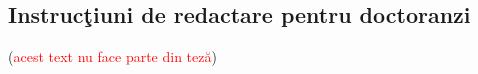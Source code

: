 
\ifpdf
    \graphicspath{{Instructions/Figs/Raster/}{Instructions/Figs/PDF/}{Instructions/Figs/}}
\else
    \graphicspath{{Instructions/Figs/Vector/}{Instructions/Figs/}}
\else
    \graphicspath{{Instructions/Figs/Regular/}{Instructions/Regular/}}    
\fi

\thispagestyle{empty}
 \newpage
 \newpage
\begin{center}
\section*{Instruc\c{t}iuni de redactare pentru doctoranzi}
\vspace{-0.5cm}
(\textcolor{red}{acest text nu face parte din tez\u{a}})
\end{center}

\thispagestyle{empty}
